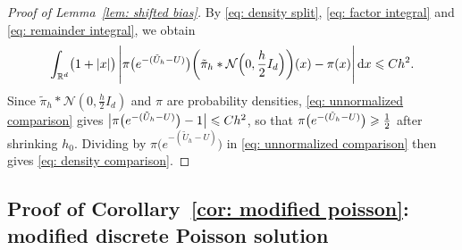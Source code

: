 \begin{proof}[Proof of Lemma~\ref{lem: shifted bias}]
    By \eqref{eq: density split}, \eqref{eq: factor integral} and \eqref{eq: remainder integral}, we obtain
    \begin{equation}
        \int_{\mathbb R^d} \bigl( 1 + |x| \bigr)\, \Biggl| \pi\bigl( e^{-(\tilde U_h - U)} \bigr) \biggl( \tilde\pi_h * \mathcal N\Bigl( 0, \frac h2 I_d \Bigr) \biggr)(x) - \pi(x) \Biggr| \,\mathrm{d} x \leqslant C h^2 .
        \label{eq: unnormalized comparison}
    \end{equation}
    Since $\tilde\pi_h * \mathcal N(0, \frac h2 I_d)$ and $\pi$ are probability densities, \eqref{eq: unnormalized comparison} gives $\bigl| \pi\bigl( e^{-(\tilde U_h - U)} \bigr) - 1 \bigr| \leqslant C h^2$, so that $\pi\bigl( e^{-(\tilde U_h - U)} \bigr) \geqslant \frac12$ after shrinking $h_0$. Dividing by $\pi\bigl( e^{-(\tilde U_h - U)} \bigr)$ in \eqref{eq: unnormalized comparison} then gives \eqref{eq: density comparison}.
\end{proof}

\subsection{Proof of Corollary~\ref{cor: modified poisson}: modified discrete Poisson solution}
\label{sec: modified poisson proof}

